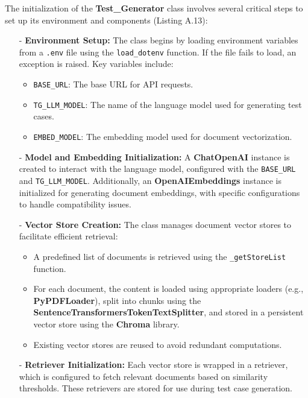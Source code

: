 The initialization of the \textbf{Test\_Generator} class involves several critical steps to set up its environment and components (Listing A.13):

\begin{itemize}
    \item[-] \textbf{Environment Setup:} The class begins by loading environment variables from a \texttt{.env} file using the \texttt{load\_dotenv} function. If the file fails to load, an exception is raised. Key variables include:
    \begin{itemize}
        \item \texttt{BASE\_URL}: The base URL for API requests.
        \item \texttt{TG\_LLM\_MODEL}: The name of the language model used for generating test cases.
        \item \texttt{EMBED\_MODEL}: The embedding model used for document vectorization.
    \end{itemize}

    \item[-] \textbf{Model and Embedding Initialization:} A \textbf{ChatOpenAI} instance is created to interact with the language model, configured with the \texttt{BASE\_URL} and \texttt{TG\_LLM\_MODEL}. Additionally, an \textbf{OpenAIEmbeddings} instance is initialized for generating document embeddings, with specific configurations to handle compatibility issues.

    \item[-] \textbf{Vector Store Creation:} The class manages document vector stores to facilitate efficient retrieval:
    \begin{itemize}
        \item A predefined list of documents is retrieved using the \texttt{\_getStoreList} function.
        \item For each document, the content is loaded using appropriate loaders (e.g., \textbf{PyPDFLoader}), split into chunks using the \textbf{SentenceTransformersTokenTextSplitter}, and stored in a persistent vector store using the \textbf{Chroma} library.
        \item Existing vector stores are reused to avoid redundant computations.
    \end{itemize}

    \item[-] \textbf{Retriever Initialization:} Each vector store is wrapped in a retriever, which is configured to fetch relevant documents based on similarity thresholds. These retrievers are stored for use during test case generation.


\end{itemize}
